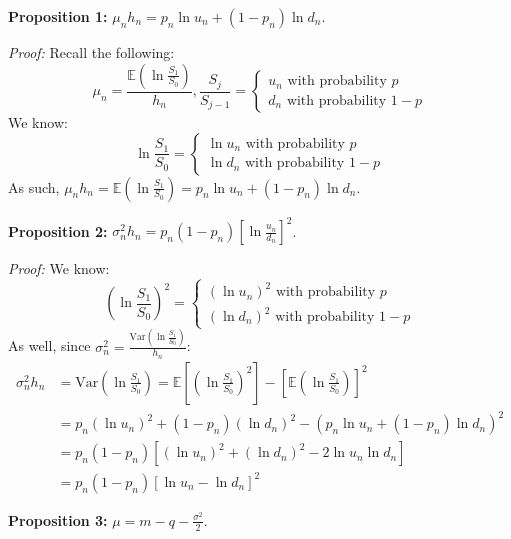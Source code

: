 \textbf{Proposition 1: } \(\boxed{\mu_nh_n = p_n\ln u_n + (1-p_n)\ln d_n}\).

\textit{Proof: } Recall the following:
\begin{equation*}
    \mu_n = \frac{\mathbb{E}(\ln \frac{S_1}{S_0})}{h_n}, \frac{S_j}{S_{j-1}} = \begin{cases}
        u_n \text{ with probability } p \\
        d_n \text{ with probability } 1-p
    \end{cases}
\end{equation*}
We know:
\begin{equation*}
    \ln \frac{S_1}{S_0} = \begin{cases}
        \ln u_n \text{ with probability } p \\
        \ln d_n \text{ with probability } 1-p
    \end{cases}
\end{equation*}
As such, \(\mu_nh_n = \mathbb{E}(\ln \frac{S_1}{S_0}) = p_n \ln u_n + (1-p_n)\ln d_n\).

\textbf{Proposition 2: } \(\boxed{\sigma_n^2 h_n = p_n(1-p_n)[\ln \frac{u_n}{d_n}]^2}\).

\textit{Proof: }
We know:
\begin{equation*}
     (\ln \frac{S_1}{S_0})^2 = \begin{cases}
        (\ln u_n)^2 \text{ with probability } p \\
        (\ln d_n)^2 \text{ with probability } 1-p
    \end{cases}
\end{equation*}
As well, since \(\sigma_n^2 = \frac{\text{Var}(\ln \frac{S_1}{S_0})}{h_n}\):
\begin{align*}
    \sigma_n^2 h_n &= \text{Var}(\ln \frac{S_1}{S_0}) = \mathbb{E}[(\ln \frac{S_1}{S_0})^2] - [\mathbb{E}(\ln \frac{S_1}{S_0})]^2 \\
    &= p_n(\ln u_n)^2 + (1-p_n)(\ln d_n)^2 - (p_n \ln u_n + (1-p_n)\ln d_n)^2 \\
    &= p_n (1-p_n)[(\ln u_n)^2 + (\ln d_n)^2 - 2 \ln u_n \ln d_n] \\
    &= p_n(1-p_n)[\ln u_n - \ln d_n]^2
\end{align*}

\textbf{Proposition 3: } \(\boxed{\mu = m - q - \frac{\sigma^2}{2}}\).


